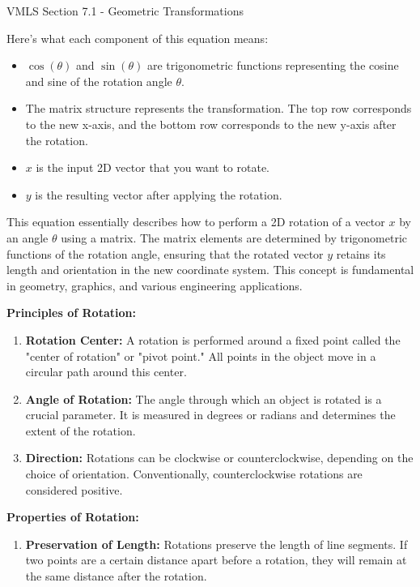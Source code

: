 \begin{notes}{VMLS Section 7.1 - Geometric Transformations}
\begin{Highlight}
        Here's what each component of this equation means:

        \begin{itemize}
            \item \(\cos{(\theta)}\) and \(\sin{(\theta)}\) are trigonometric functions representing the cosine and sine of the rotation angle \(\theta\).
            \item The matrix structure represents the transformation. The top row corresponds to the new x-axis, and the bottom row corresponds to the new y-axis after the rotation.
            \item \(x\) is the input 2D vector that you want to rotate.
            \item \(y\) is the resulting vector after applying the rotation.
        \end{itemize}

        This equation essentially describes how to perform a 2D rotation of a vector \(x\) by an angle \(\theta\) using a matrix. The matrix elements are determined by trigonometric functions of the rotation 
        angle, ensuring that the rotated vector \(y\) retains its length and orientation in the new coordinate system. This concept is fundamental in geometry, graphics, and various engineering applications.
    \end{Highlight}

    \textbf{Principles of Rotation:}

    \begin{enumerate}
        \item \textbf{Rotation Center:} A rotation is performed around a fixed point called the "center of rotation" or "pivot point." All points in the object move in a circular path around this center.
        
        \item \textbf{Angle of Rotation:} The angle through which an object is rotated is a crucial parameter. It is measured in degrees or radians and determines the extent of the rotation.
        
        \item \textbf{Direction:} Rotations can be clockwise or counterclockwise, depending on the choice of orientation. Conventionally, counterclockwise rotations are considered positive.
    \end{enumerate}

    \textbf{Properties of Rotation:}

    \begin{enumerate}
        \item \textbf{Preservation of Length:} Rotations preserve the length of line segments. If two points are a certain distance apart before a rotation, they will remain at the same distance after 
        the rotation.
        

\end{enumerate}
\end{notes}
